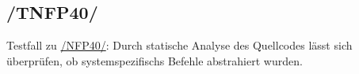 \subsection*{/TNFP40/}

\label{/TNFP40/} Testfall zu \hyperref[/NFP40/]{/NFP40/}: Durch \gls{statische Analyse} des \Gls{Quellcode}s lässt sich überprüfen, ob \glspl{systemspezifisch} Befehle abstrahiert wurden.